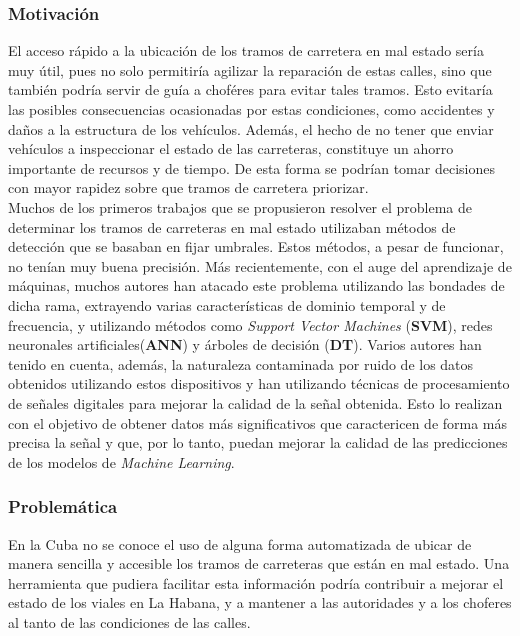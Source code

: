 	\subsubsection*{Motivación}
		El acceso rápido a la ubicación de los tramos de carretera en mal estado sería muy útil, pues no solo permitiría agilizar la
		reparación de estas calles, sino que también podría servir de guía a choféres para evitar tales tramos. Esto evitaría las posibles
		consecuencias ocasionadas por estas condiciones, como accidentes y daños a la estructura de los vehículos. Además, el hecho de no tener que
		enviar vehículos a inspeccionar el estado de las carreteras, constituye un ahorro importante de recursos y de tiempo. De esta forma se podrían
		tomar decisiones con mayor rapidez sobre que tramos de carretera priorizar.\\
		Muchos de los primeros trabajos que se propusieron resolver el problema de determinar los tramos de carreteras en mal estado utilizaban
		métodos de detección que se basaban en fijar umbrales. Estos métodos, a pesar de funcionar, no tenían muy buena precisión. Más recientemente, con el auge del aprendizaje de máquinas, muchos autores han atacado este problema utilizando
		las bondades de dicha rama, extrayendo varias características de dominio temporal y de frecuencia, y utilizando métodos como \emph{Support Vector
		Machines} (\textbf{SVM}), redes neuronales artificiales(\textbf{ANN}) y árboles de decisión (\textbf{DT}). Varios autores han tenido en cuenta, además, la naturaleza contaminada por ruido de
		los datos obtenidos utilizando estos dispositivos y han utilizando técnicas de procesamiento de señales digitales para mejorar la calidad de la señal
		obtenida.  Esto lo realizan con el objetivo de obtener datos más significativos que caractericen de forma más precisa la señal y que, por lo tanto, puedan mejorar
		la calidad de las predicciones de los modelos de \emph{Machine Learning}.\\
		
	\subsubsection*{Problemática}
		En la Cuba no se conoce el uso de alguna forma automatizada de ubicar de manera sencilla y accesible los tramos de carreteras que están en mal estado. 
		Una herramienta que pudiera facilitar esta información podría contribuir a mejorar el estado de los viales en La Habana, y a mantener a las autoridades y a 
		los choferes al tanto de las condiciones de las calles.
		
